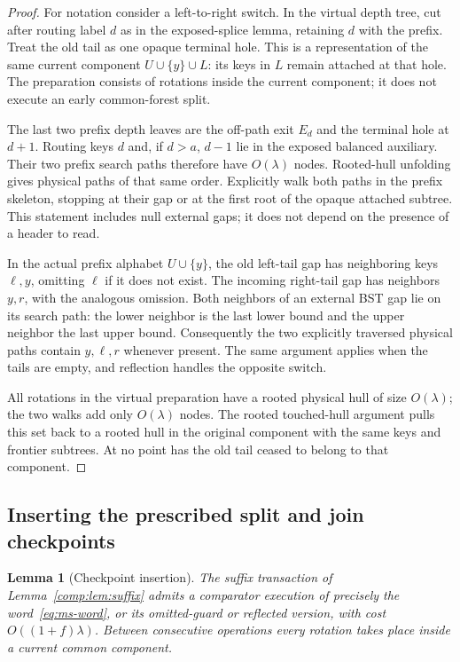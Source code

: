\documentclass[11pt]{article}
\numberwithin{equation}{section}
\newtheorem{lemma}[theorem]{Lemma}
\begin{document}
\begin{proof}
For notation consider a left-to-right switch. In the virtual depth
tree, cut after routing label $d$ as in the exposed-splice lemma,
retaining $d$ with the prefix. Treat the old tail as one opaque
terminal hole. This is a representation of the same current component
$U\cup\{y\}\cup L$: its keys in $L$ remain attached at that hole.
The preparation consists of rotations inside the current component;
it does not execute an early common-forest split.

The last two prefix depth leaves are the off-path exit $E_d$ and the
terminal hole at $d+1$. Routing keys $d$ and, if $d>a$, $d-1$ lie in
the exposed balanced auxiliary. Their two prefix search paths therefore
have $O(\lambda)$ nodes. Rooted-hull unfolding gives physical paths
of that same order. Explicitly walk both paths in the prefix skeleton,
stopping at their gap or at the first root of the opaque attached
subtree. This statement includes null external gaps; it does not
depend on the presence of a header to read.

In the actual prefix alphabet $U\cup\{y\}$, the old left-tail gap
has neighboring keys $\ell,y$, omitting $\ell$ if it does not exist.
The incoming right-tail gap has neighbors $y,r$, with the analogous
omission. Both neighbors of an external BST gap lie on its search path:
the lower neighbor is the last lower bound and the upper neighbor the
last upper bound. Consequently the two explicitly traversed physical
paths contain $y,\ell,r$ whenever present. The same argument applies
when the tails are empty, and reflection handles the opposite switch.

All rotations in the virtual preparation have a rooted physical hull
of size $O(\lambda)$; the two walks add only $O(\lambda)$ nodes.
The rooted touched-hull argument pulls this set back to a rooted hull
in the original component with the same keys and frontier subtrees.
At no point has the old tail ceased to belong to that component.
\end{proof}

\subsection{Inserting the prescribed split and join checkpoints}

\begin{lemma}[Checkpoint insertion]\label{comp:lem:checkpoints}
The suffix transaction of Lemma~\ref{comp:lem:suffix} admits a comparator
execution of precisely the word~\eqref{eq:ms-word}, or its omitted-guard or reflected
version, with cost $O((1+f)\lambda)$. Between consecutive operations
every rotation takes place inside a current common component.
\end{lemma}
\end{document}
